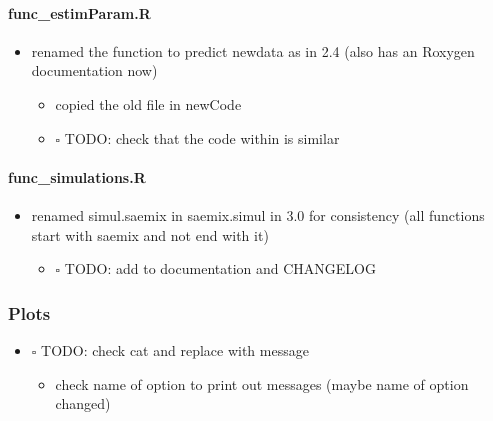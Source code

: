 \documentclass[
]{article}
\providecommand{\tightlist}{%
  \setlength{\itemsep}{0pt}\setlength{\parskip}{0pt}}
\begin{document}
\hypertarget{func_estimparam.r}{%
\paragraph{func\_estimParam.R}\label{func_estimparam.r}}

\begin{itemize}
\tightlist
\item
  renamed the function to predict newdata as in 2.4 (also has an Roxygen
  documentation now)

  \begin{itemize}
  \tightlist
  \item
    copied the old file in newCode
  \item
    \(\square\) TODO: check that the code within is similar
  \end{itemize}
\end{itemize}

\hypertarget{func_simulations.r}{%
\paragraph{func\_simulations.R}\label{func_simulations.r}}

\begin{itemize}
\tightlist
\item
  renamed simul.saemix in saemix.simul in 3.0 for consistency (all
  functions start with saemix and not end with it)

  \begin{itemize}
  \tightlist
  \item
    \(\square\) TODO: add to documentation and CHANGELOG
  \end{itemize}
\end{itemize}

\hypertarget{plots}{%
\subsubsection{Plots}\label{plots}}

\begin{itemize}
\tightlist
\item
  \(\square\) TODO: check cat and replace with message

  \begin{itemize}
  \tightlist
  \item
    check name of option to print out messages (maybe name of option
    changed)
  \end{itemize}
\end{itemize}
\end{document}
